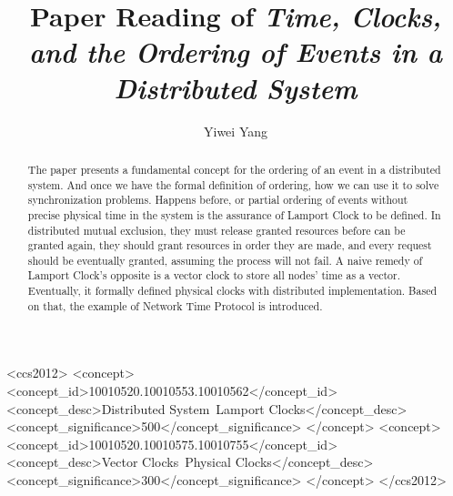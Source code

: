 \documentclass[acmlarge]{acmart}
\begin{document}
\title{Paper Reading of \textit{Time, Clocks, and the Ordering of Events in a Distributed System}}

\author{Yiwei Yang}
\renewcommand{\shortauthors}{Yiwei Yang}

\begin{abstract}
  The paper \cite{lamport2019time} presents a fundamental concept for the ordering of an event in a distributed system.
  And once we have the formal definition of ordering, how we can use it to solve synchronization
  problems. Happens before, or partial ordering of events without precise physical time in the system
  is the assurance of Lamport Clock to be defined. In distributed mutual exclusion, they must release
  granted resources before can be granted again, they should grant resources in order they are made, and
  every request should be eventually granted, assuming the process will not fail. A naive remedy of
  Lamport Clock's opposite is a vector clock to store all nodes' time as a vector. Eventually, it formally defined physical clocks
  with distributed implementation. Based on that, the example of Network Time Protocol is introduced.
\end{abstract}

\begin{CCSXML}
  <ccs2012>
  <concept>
  <concept_id>10010520.10010553.10010562</concept_id>
  <concept_desc>Distributed System~Lamport Clocks</concept_desc>
  <concept_significance>500</concept_significance>
  </concept>
  <concept>
  <concept_id>10010520.10010575.10010755</concept_id>
  <concept_desc>Vector Clocks~Physical Clocks</concept_desc>
  <concept_significance>300</concept_significance>
  </concept>
  </ccs2012>
\end{CCSXML}

\end{document}
